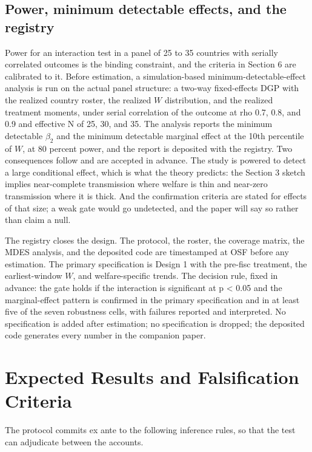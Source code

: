 \documentclass[11pt,letterpaper]{article}
\begin{document}
\subsection{Power, minimum detectable effects, and the registry}

Power for an interaction test in a panel of 25 to 35 countries with serially correlated outcomes is the binding constraint, and the criteria in Section 6 are calibrated to it. Before estimation, a simulation-based minimum-detectable-effect analysis is run on the actual panel structure: a two-way fixed-effects DGP with the realized country roster, the realized $W$ distribution, and the realized treatment moments, under serial correlation of the outcome at rho 0.7, 0.8, and 0.9 and effective N of 25, 30, and 35. The analysis reports the minimum detectable $\beta_2$ and the minimum detectable marginal effect at the 10th percentile of $W$, at 80 percent power, and the report is deposited with the registry. Two consequences follow and are accepted in advance. The study is powered to detect a large conditional effect, which is what the theory predicts: the Section 3 sketch implies near-complete transmission where welfare is thin and near-zero transmission where it is thick. And the confirmation criteria are stated for effects of that size; a weak gate would go undetected, and the paper will say so rather than claim a null.

The registry closes the design. The protocol, the roster, the coverage matrix, the MDES analysis, and the deposited code are timestamped at OSF before any estimation. The primary specification is Design 1 with the pre-fisc treatment, the earliest-window $W$, and welfare-specific trends. The decision rule, fixed in advance: the gate holds if the interaction is significant at p < 0.05 and the marginal-effect pattern is confirmed in the primary specification and in at least five of the seven robustness cells, with failures reported and interpreted. No specification is added after estimation; no specification is dropped; the deposited code generates every number in the companion paper.

\section{Expected Results and Falsification Criteria}

The protocol commits ex ante to the following inference rules, so that the test can adjudicate between the accounts.
\end{document}
